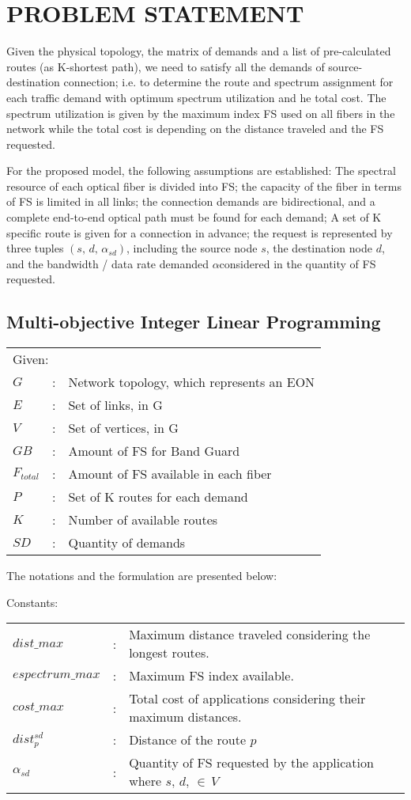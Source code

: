 
\chapter{PROBLEM STATEMENT }

Given the physical topology, the matrix of demands and a list of pre-calculated
routes (as K-shortest path), we need to satisfy all the demands of
source-destination connection; i.e. to determine the route and spectrum
assignment for each traffic demand with optimum spectrum utilization
and he total cost. The spectrum utilization is given by the maximum
index FS used on all fibers in the network while the total cost is
depending on the distance traveled and the FS requested. 

For the proposed model, the following assumptions are established:
The spectral resource of each optical fiber is divided into FS; the
capacity of the fiber in terms of FS is limited in all links; the
connection demands are bidirectional, and a complete end-to-end optical
path must be found for each demand; A set of K specific route is given
for a connection in advance; the request is represented by three tuples
$\left(s,\,d,\,\alpha_{sd}\right)$, including the source node $s$,
the destination node $d$, and the bandwidth / data rate demanded
$\alpha$considered in the quantity of FS requested.

\section{Multi-objective Integer Linear Programming}

\begin{tabular}{lcl}
\multicolumn{3}{l}{Given:}\tabularnewline
$G$ & : & Network topology, which represents an EON\tabularnewline
$E$ & : & Set of links, in G\tabularnewline
$V$ & : & Set of vertices, in G\tabularnewline
$GB$ & : & Amount of FS for Band Guard\tabularnewline
$F_{total}$ & : & Amount of FS available in each fiber\tabularnewline
$P$ & : & Set of K routes for each demand\tabularnewline
$K$ & : & Number of available routes\tabularnewline
$SD$ & : & Quantity of demands\tabularnewline
\end{tabular}

\phantom{}

The notations and the formulation are presented below:

\phantom{}

Constants:

\begin{tabular}{lcl}
$dist\_max$ & : & Maximum distance traveled considering the longest routes. \tabularnewline
$espectrum\_max$ & : & Maximum FS index available.\tabularnewline
$cost\_max$ & : & Total cost of applications considering their maximum distances.\tabularnewline
$dist_{p}^{sd}$ & : & Distance of the route $p$\tabularnewline
$\alpha_{sd}$ & : & Quantity of FS requested by the application where $s,\,d,\,\in\,V$ \tabularnewline
\end{tabular}

